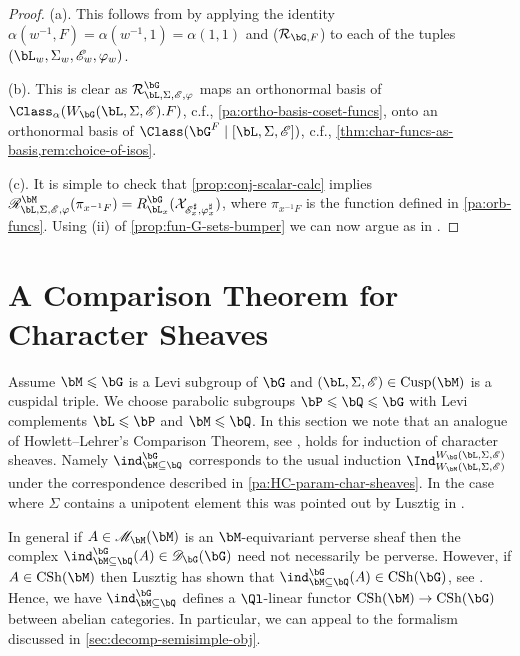 \documentclass[eqthmnum,nocolour,skinny]{jt-calcs}
\DeclareMathOperator{\CS}{CSh}
\DeclareMathOperator{\Cusp}{Cusp}
\begin{document}
\begin{proof}
(a). This follows from \cite[10.4.5]{lusztig:1985:character-sheaves} by applying the identity $\alpha(w^{-1},F) = \alpha(w^{-1},1) = \alpha(1,1)$ and ($\mathcal{R}_{\bG,F}$) to each of the tuples $(\bL_w,\Sigma_w,\mathscr{E}_w,\varphi_w)$.

(b). This is clear as $\mathcal{R}^{\bG}_{\bL,\Sigma,\mathscr{E},\varphi}$ maps an orthonormal basis of $\Class_{\alpha}(W_{\bG}(\bL,\Sigma,\mathscr{E}).F)$, c.f., \cref{pa:ortho-basis-coset-funcs}, onto an orthonormal basis of $\Class(\bG^F \mid [\bL,\Sigma,\mathscr{E}])$, c.f., \cref{thm:char-funcs-as-basis,rem:choice-of-isos}.

(c). It is simple to check that \cref{prop:conj-scalar-calc} implies $\mathscr{R}^{\bM}_{\bL,\Sigma,\mathscr{E},\varphi}(\pi_{x^{-1}F}) = R_{\bL_x}^{\bG}(\mathcal{X}_{\mathscr{E}_x^{\sharp},\varphi_x^{\sharp}})$, where $\pi_{x^{-1}F}$ is the function defined in \cref{pa:orb-funcs}. Using (ii) of \cref{prop:fun-G-sets-bumper} we can now argue as in \cite[Prop.~15.7]{digne-michel:1991:representations-of-finite-groups-of-lie-type}.
\end{proof}

\section{A Comparison Theorem for Character Sheaves}\label{sec:comparison-thms}
\begin{pa}
Assume $\bM \leqslant \bG$ is a Levi subgroup of $\bG$ and $(\bL,\Sigma,\mathscr{E}) \in \Cusp(\bM)$ is a cuspidal triple. We choose parabolic subgroups $\bP \leqslant \bQ \leqslant \bG$ with Levi complements $\bL \leqslant \bP$ and $\bM \leqslant \bQ$. In this section we note that an analogue of Howlett--Lehrer's Comparison Theorem, see \cite[5.9]{howlett-lehrer:1983:representations-of-generic-algebras}, holds for induction of character sheaves. Namely $\ind_{\bM\subseteq\bQ}^{\bG}$ corresponds to the usual induction $\Ind_{W_{\bM}(\bL,\Sigma,\mathscr{E})}^{W_{\bG}(\bL,\Sigma,\mathscr{E})}$ under the correspondence described in \cref{pa:HC-param-char-sheaves}. In the case where $\Sigma$ contains a unipotent element this was pointed out by Lusztig in \cite[2.5]{lusztig:1986:on-the-character-values}.
\end{pa}

\begin{pa}
In general if $A \in \mathscr{M}_{\bM}(\bM)$ is an $\bM$-equivariant perverse sheaf then the complex $\ind_{\bM\subseteq\bQ}^{\bG}(A) \in \mathscr{D}_{\bG}(\bG)$ need not necessarily be perverse. However, if $A \in \CS(\bM)$ then Lusztig has shown that $\ind_{\bM\subseteq\bQ}^{\bG}(A) \in \CS(\bG)$, see \cite[4.4]{lusztig:1985:character-sheaves}. Hence, we have $\ind_{\bM\subseteq\bQ}^{\bG}$ defines a $\Ql$-linear functor $\CS(\bM) \to \CS(\bG)$ between abelian categories. In particular, we can appeal to the formalism discussed in \cref{sec:decomp-semisimple-obj}.
\end{pa}
\end{document}
